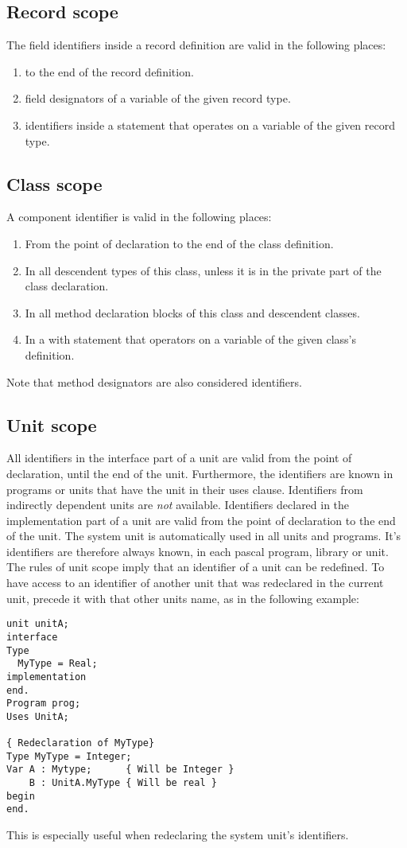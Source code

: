 \subsection{Record scope}
The field identifiers inside a record definition are valid in the following
places:
\begin{enumerate}
\item to the end of the record definition.
\item field designators of a variable of the given record type.
\item identifiers inside a  statement that operates on a variable
of the given record type.
\end{enumerate}
\subsection{Class scope}
A component identifier is valid in the following places:
\begin{enumerate}
\item From the point of declaration to the end of the class definition.
\item In all descendent types of this class, unless it is in the private
part of the class declaration.
\item In all method declaration blocks of this class and descendent classes.
\item In a with statement that operators on a variable of the given class's
definition.
\end{enumerate}
Note that method designators are also considered identifiers.
\subsection{Unit scope}
All identifiers in the interface part of a unit are valid from the point of
declaration, until the end of the unit. Furthermore, the identifiers are
known in programs or units that have the unit in their uses clause.
Identifiers from indirectly dependent units are {\em not} available.
Identifiers declared in the implementation part of a unit are valid from the
point of declaration to the end of the unit.
The system unit is automatically used in all units and programs.
It's identifiers are therefore always known, in each pascal program, library
or unit.
The rules of unit scope imply that an identifier of a
unit can be redefined. To have access to an identifier of another unit that was redeclared in
the current unit, precede it with that other units name, as in the following
example:
\begin{verbatim}
unit unitA;
interface
Type
  MyType = Real;
implementation
end.
Program prog;
Uses UnitA;

{ Redeclaration of MyType}
Type MyType = Integer;
Var A : Mytype;      { Will be Integer }
    B : UnitA.MyType { Will be real }
begin
end.
\end{verbatim}
This is especially useful when redeclaring the system unit's identifiers.

